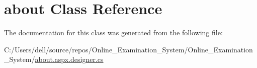 \hypertarget{classabout}{}\section{about Class Reference}
\label{classabout}


The documentation for this class was generated from the following file\+:\begin{DoxyCompactItemize}
\item 
C\+:/\+Users/dell/source/repos/\+Online\+\_\+\+Examination\+\_\+\+System/\+Online\+\_\+\+Examination\+\_\+\+System/\mbox{\hyperlink{about_8aspx_8designer_8cs}{about.\+aspx.\+designer.\+cs}}\end{DoxyCompactItemize}
